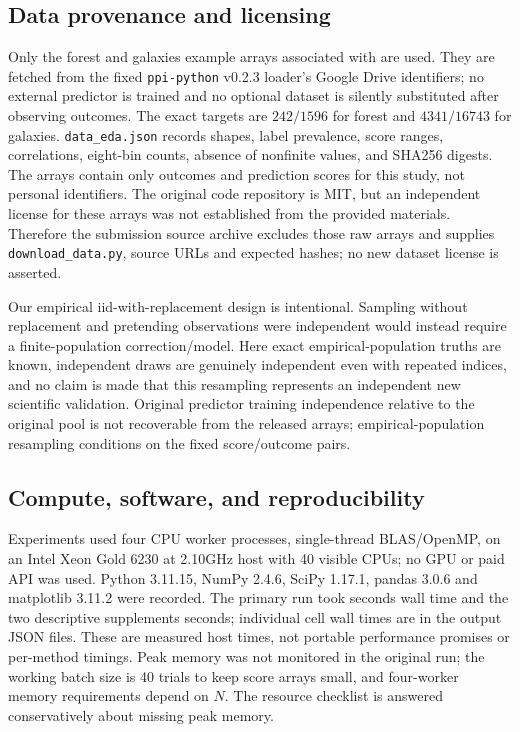 \documentclass{article}
\begin{document}
\subsection{Data provenance and licensing}
Only the forest and galaxies example arrays associated with \citet{ppi} are used. They are fetched from the fixed \texttt{ppi-python} v0.2.3 loader's Google Drive identifiers; no external predictor is trained and no optional dataset is silently substituted after observing outcomes. The exact targets are $242/1596$ for forest and $4341/16743$ for galaxies. \texttt{data\_eda.json} records shapes, label prevalence, score ranges, correlations, eight-bin counts, absence of nonfinite values, and SHA256 digests. The arrays contain only outcomes and prediction scores for this study, not personal identifiers. The original code repository is MIT, but an independent license for these arrays was not established from the provided materials. Therefore the submission source archive excludes those raw arrays and supplies \texttt{download\_data.py}, source URLs and expected hashes; no new dataset license is asserted.

Our empirical iid-with-replacement design is intentional. Sampling without replacement and pretending observations were independent would instead require a finite-population correction/model. Here exact empirical-population truths are known, independent draws are genuinely independent even with repeated indices, and no claim is made that this resampling represents an independent new scientific validation. Original predictor training independence relative to the original pool is not recoverable from the released arrays; empirical-population resampling conditions on the fixed score/outcome pairs.

\subsection{Compute, software, and reproducibility}
Experiments used four CPU worker processes, single-thread BLAS/OpenMP, on an Intel Xeon Gold 6230 at 2.10GHz host with 40 visible CPUs; no GPU or paid API was used. Python 3.11.15, NumPy 2.4.6, SciPy 1.17.1, pandas 3.0.6 and matplotlib 3.11.2 were recorded. The primary run took \MainRuntime{} seconds wall time and the two descriptive supplements \SupplementRuntime{} seconds; individual cell wall times are in the output JSON files. These are measured host times, not portable performance promises or per-method timings. Peak memory was not monitored in the original run; the working batch size is 40 trials to keep score arrays small, and four-worker memory requirements depend on $N$. The resource checklist is answered conservatively about missing peak memory.
\end{document}
